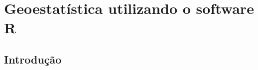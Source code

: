 




\newcommand{\estiloR}{
	\lstset{ %
		language=R,                     %
		basicstyle=\footnotesize,       %
		numbers=left,                   %
		numberstyle=\tiny\color{gray},  %
		stepnumber=1,                   %
		numbersep=5pt,                  %
		backgroundcolor=\color{white},  %
		showspaces=false,               %
		showstringspaces=false,         %
		showtabs=false,                 %
		frame=single,                   %
		rulecolor=\color{black},        %
		tabsize=2,                      %
		captionpos=b,                   %
		breaklines=true,                %
		breakatwhitespace=false,        %
		title=\lstname,                 %
		keywordstyle=\color{blue},      %
		commentstyle=\color{darkgreen},   %
		stringstyle=\color{red},      %
		escapeinside={\%*}{*)},         %
		morekeywords={*,...}          %
}}



\chapter{Geoestatística utilizando o software R}


\section{Introdução}

